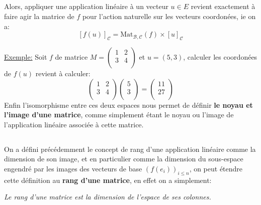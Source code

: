\subsection*{}
Alors, appliquer une application linéaire à un vecteur \(u \in E\) revient exactement à faire agir la matrice de \( f \) pour l'action naturelle sur les vecteurs coordonées, ie on a:
\[ 
   [f(u)]_{\mathscr{C}} = \text{Mat}_{\mathscr{B}, \mathscr{C}}(f)\times [u]_{\mathscr{C}}
\]

\underline{Exemple:} Soit \(f\) de matrice 
\(M = \begin{pmatrix}
   1 & 2\\
   3 & 4\\
\end{pmatrix}\) 
et \(u = (5, 3)\), calculer les coordonées de \(f(u)\) revient à calculer:
\[
   \begin{pmatrix}
      1 & 2\\
      3 & 4\\
   \end{pmatrix}
   \begin{pmatrix}
      5 \\
      3 \\
   \end{pmatrix} =
   \begin{pmatrix}
      11 \\
      27 \\
   \end{pmatrix} 
\]
Enfin l'isomorphisme entre ces deux espaces nous permet de définir \textbf{le noyau et l'image d'une matrice}, comme simplement étant le noyau ou l'image de l'application linéaire associée à cette matrice.
\subsection*{}

On a défini précédemment le concept de rang d'une application linéaire comme la dimension de son image, et en particulier comme la dimension du sous-espace engendré par les images des vecteurs de base \( (f(e_i))_{i \leq n} \), on peut étendre cette définition au \textbf{rang d'une matrice}, en effet on a simplement:
\begin{center}
   \textit{Le rang d'une matrice est la dimension de l'espace de ses colonnes.}
\end{center}

